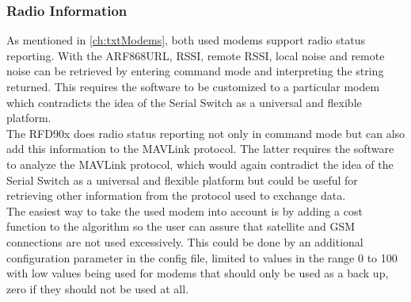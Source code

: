 \subsubsection{Radio Information}
As mentioned in \autoref{ch:txtModems}, both used modems support radio status reporting. With the ARF868URL, RSSI, remote RSSI, local noise and remote noise can be retrieved by entering command mode and interpreting the string returned. This requires the software to be customized to a particular modem which contradicts the idea of the Serial Switch as a universal and flexible platform.\\
The RFD90x does radio status reporting not only in command mode but can also add this information to the MAVLink protocol. The latter requires the software to analyze the MAVLink protocol, which would again contradict the idea of the Serial Switch as a universal and flexible platform but could be useful for retrieving other information from the protocol used to exchange data.\\
The easiest way to take the used modem into account is by adding a cost function to the algorithm so the user can assure that satellite and GSM connections are not used excessively. This could be done by an additional configuration parameter in the config file, limited to values in the range 0 to 100 with low values being used for modems that should only be used as a back up, zero if they should not be used at all.
%
